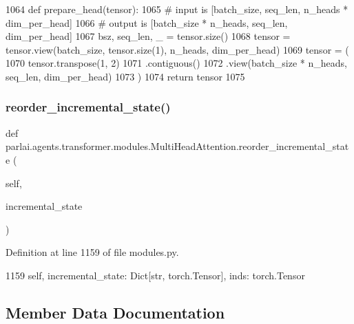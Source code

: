 \begin{DoxyCode}
1064         \textcolor{keyword}{def }prepare\_head(tensor):
1065             \textcolor{comment}{# input is [batch\_size, seq\_len, n\_heads * dim\_per\_head]}
1066             \textcolor{comment}{# output is [batch\_size * n\_heads, seq\_len, dim\_per\_head]}
1067             bsz, seq\_len, \_ = tensor.size()
1068             tensor = tensor.view(batch\_size, tensor.size(1), n\_heads, dim\_per\_head)
1069             tensor = (
1070                 tensor.transpose(1, 2)
1071                 .contiguous()
1072                 .view(batch\_size * n\_heads, seq\_len, dim\_per\_head)
1073             )
1074             \textcolor{keywordflow}{return} tensor
1075 
\end{DoxyCode}
\mbox{\label{classparlai_1_1agents_1_1transformer_1_1modules_1_1MultiHeadAttention_a3478f15a48d749a3cbfe0760722b249c}} 
\subsubsection{\texorpdfstring{reorder\+\_\+incremental\+\_\+state()}{reorder\_incremental\_state()}}
{\footnotesize\ttfamily def parlai.\+agents.\+transformer.\+modules.\+Multi\+Head\+Attention.\+reorder\+\_\+incremental\+\_\+state (\begin{DoxyParamCaption}\item[{}]{self,  }\item[{}]{incremental\+\_\+state }\end{DoxyParamCaption})}



Definition at line 1159 of file modules.\+py.


\begin{DoxyCode}
1159         self, incremental\_state: Dict[str, torch.Tensor], inds: torch.Tensor
\end{DoxyCode}


\subsection{Member Data Documentation}
\mbox{\label{classparlai_1_1agents_1_1transformer_1_1modules_1_1MultiHeadAttention_a59719fa112c890e082ef22280fe13cc4}} 
